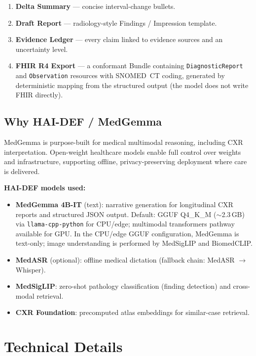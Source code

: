 \documentclass[10pt,twocolumn]{article}
\begin{document}
\begin{enumerate}
  \item \textbf{Delta Summary} --- concise interval-change bullets.
  \item \textbf{Draft Report} --- radiology-style Findings / Impression template.
  \item \textbf{Evidence Ledger} --- every claim linked to evidence sources and an uncertainty level.
  \item \textbf{FHIR R4 Export} --- a conformant Bundle containing \texttt{DiagnosticReport} and \texttt{Observation} resources with SNOMED~CT coding, generated by deterministic mapping from the structured output (the model does not write FHIR directly).
\end{enumerate}

\subsection{Why HAI-DEF / MedGemma}

MedGemma is purpose-built for medical multimodal reasoning, including CXR interpretation.
Open-weight healthcare models enable full control over weights and infrastructure, supporting offline, privacy-preserving deployment where care is delivered.

\smallskip
\noindent\textbf{HAI-DEF models used:}

\begin{itemize}
  \item \textbf{MedGemma 4B-IT} (text): narrative generation for longitudinal CXR reports and structured JSON output. Default: GGUF Q4\_K\_M (${\sim}$2.3\,GB) via \texttt{llama-cpp-python} for CPU/edge; multimodal transformers pathway available for GPU. In the CPU/edge GGUF configuration, MedGemma is text-only; image understanding is performed by MedSigLIP and BiomedCLIP.
  \item \textbf{MedASR} (optional): offline medical dictation (fallback chain: MedASR $\rightarrow$ Whisper).
  \item \textbf{MedSigLIP}: zero-shot pathology classification (finding detection) and cross-modal retrieval.
  \item \textbf{CXR Foundation}: precomputed atlas embeddings for similar-case retrieval.
\end{itemize}

\section{Technical Details}
\end{document}
